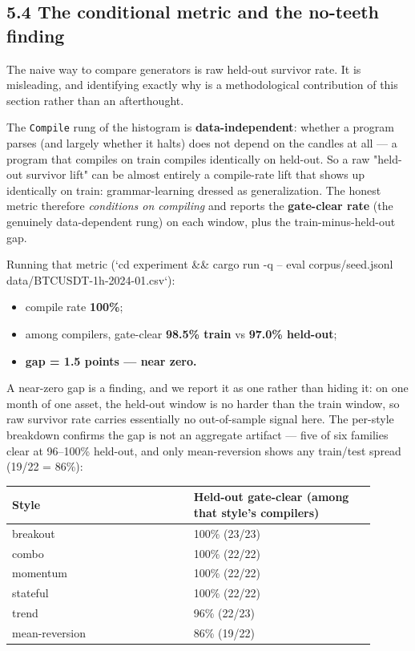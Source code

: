 \documentclass[11pt]{article}
\newcommand{\code}[1]{\texttt{#1}}
\begin{document}
\subsection*{5.4 The conditional metric and the no-teeth finding}

The naive way to compare generators is raw held-out survivor rate. It is
misleading, and identifying exactly why is a methodological contribution of this
section rather than an afterthought.

The \code{Compile} rung of the histogram is \textbf{data-independent}: whether a program
parses (and largely whether it halts) does not depend on the candles at all --- a
program that compiles on train compiles identically on held-out. So a raw
"held-out survivor lift" can be almost entirely a compile-rate lift that shows
up identically on train: grammar-learning dressed as generalization. The honest
metric therefore \emph{conditions on compiling} and reports the \textbf{gate-clear rate}
(the genuinely data-dependent rung) on each window, plus the
train-minus-held-out gap.

Running that metric (`cd experiment \&\& cargo run -q -- eval corpus/seed.jsonl
data/BTCUSDT-1h-2024-01.csv`):

\begin{itemize}[leftmargin=*]
\item compile rate \textbf{100\%};
\item among compilers, gate-clear \textbf{98.5\% train} vs \textbf{97.0\% held-out};
\item \textbf{gap = 1.5 points --- near zero.}
\end{itemize}

A near-zero gap is a finding, and we report it as one rather than hiding it: on
one month of one asset, the held-out window is no harder than the train window,
so raw survivor rate carries essentially no out-of-sample signal here. The
per-style breakdown confirms the gap is not an aggregate artifact --- five of six
families clear at 96--100\% held-out, and only mean-reversion shows any train/test
spread (19/22 = 86\%):

\begingroup\small
\begin{longtable}{p{0.450\linewidth} p{0.450\linewidth}}
\toprule
\textbf{Style} & \textbf{Held-out gate-clear (among that style's compilers)} \\
\midrule\endhead
breakout & 100\% (23/23) \\
combo & 100\% (22/22) \\
momentum & 100\% (22/22) \\
stateful & 100\% (22/22) \\
trend & 96\% (22/23) \\
mean-reversion & 86\% (19/22) \\
\bottomrule
\end{longtable}\endgroup
\end{document}
